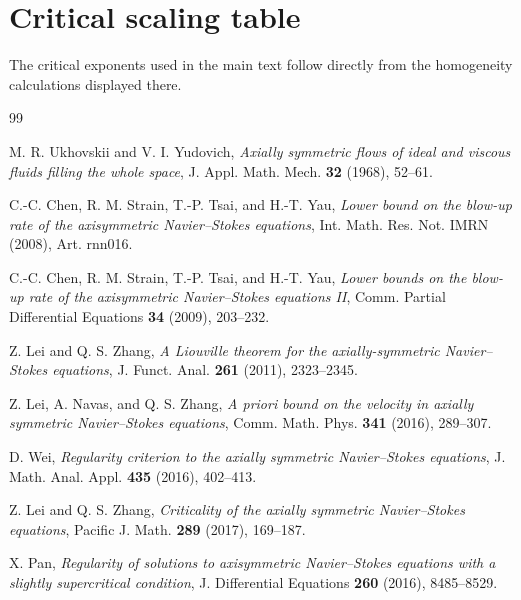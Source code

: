 \documentclass[11pt]{article}
\theoremstyle{definition}\newtheorem{definition}[theorem]{Definition}
\theoremstyle{remark}\newtheorem{remark}[theorem]{Remark}
\begin{document}
\appendix
\section{Critical scaling table}
The critical exponents used in the main text follow directly from the homogeneity calculations displayed there.

\begin{thebibliography}{99}

M. R. Ukhovskii and V. I. Yudovich,
\emph{Axially symmetric flows of ideal and viscous fluids filling the whole space},
J. Appl. Math. Mech. \textbf{32} (1968), 52--61.

C.-C. Chen, R. M. Strain, T.-P. Tsai, and H.-T. Yau,
\emph{Lower bound on the blow-up rate of the axisymmetric Navier--Stokes equations},
Int. Math. Res. Not. IMRN (2008), Art. rnn016.

C.-C. Chen, R. M. Strain, T.-P. Tsai, and H.-T. Yau,
\emph{Lower bounds on the blow-up rate of the axisymmetric Navier--Stokes equations II},
Comm. Partial Differential Equations \textbf{34} (2009), 203--232.

Z. Lei and Q. S. Zhang,
\emph{A Liouville theorem for the axially-symmetric Navier--Stokes equations},
J. Funct. Anal. \textbf{261} (2011), 2323--2345.

Z. Lei, A. Navas, and Q. S. Zhang,
\emph{A priori bound on the velocity in axially symmetric Navier--Stokes equations},
Comm. Math. Phys. \textbf{341} (2016), 289--307.

D. Wei,
\emph{Regularity criterion to the axially symmetric Navier--Stokes equations},
J. Math. Anal. Appl. \textbf{435} (2016), 402--413.

Z. Lei and Q. S. Zhang,
\emph{Criticality of the axially symmetric Navier--Stokes equations},
Pacific J. Math. \textbf{289} (2017), 169--187.

X. Pan,
\emph{Regularity of solutions to axisymmetric Navier--Stokes equations with a slightly supercritical condition},
J. Differential Equations \textbf{260} (2016), 8485--8529.

\end{thebibliography}
\end{document}
